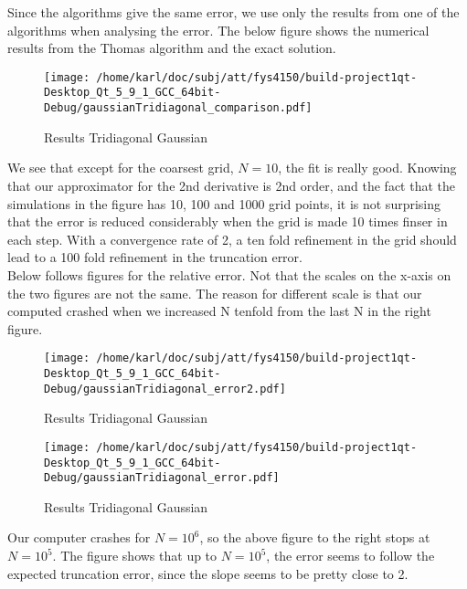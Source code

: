 \documentclass{article}
\begin{document}
Since the algorithms give the same error, we use only the results from one of the algorithms when analysing the error. The below figure shows the numerical results from the Thomas algorithm and the exact solution.

\begin{figure}[H]
	\centering
	\texttt{[image: /home/karl/doc/subj/att/fys4150/build-project1qt-Desktop\_Qt\_5\_9\_1\_GCC\_64bit-Debug/gaussianTridiagonal\_comparison.pdf]}
	\caption{Results Tridiagonal Gaussian}
\end{figure}

We see that except for the coarsest grid, $N=10$, the fit is really good. Knowing that our approximator for the 2nd derivative is 2nd order, and the fact that the simulations in the figure has 10, 100 and 1000 grid points, it is not surprising that the error is reduced considerably when the grid is made 10 times finser in each step. With a convergence rate of 2, a ten fold refinement in the grid should lead to a 100 fold refinement in the truncation error.\\

Below follows figures for the relative error. Not that the scales on the x-axis on the two figures are not the same. The reason for different scale is that our computed crashed when we increased N tenfold from the last N in the right figure.\\


\begin{minipage}{.49\textwidth} %
\begin{figure}[H]
	\centering
	\texttt{[image: /home/karl/doc/subj/att/fys4150/build-project1qt-Desktop\_Qt\_5\_9\_1\_GCC\_64bit-Debug/gaussianTridiagonal\_error2.pdf]}
	\caption{Results Tridiagonal Gaussian}
	\label{1}
\end{figure}
\end{minipage}\hfill
\begin{minipage}{.49\textwidth}
\begin{figure}[H]
	\centering
	\texttt{[image: /home/karl/doc/subj/att/fys4150/build-project1qt-Desktop\_Qt\_5\_9\_1\_GCC\_64bit-Debug/gaussianTridiagonal\_error.pdf]}
	\caption{Results Tridiagonal Gaussian}
	\label{1}
\end{figure}

\end{minipage}\hfill

Our computer crashes for $N = 10^6$, so the above figure to the right stops at $N = 10^5$. The figure shows that up to $N = 10^5$, the error seems to follow the expected truncation error, since the slope seems to be pretty close to 2.\\
\end{document}
